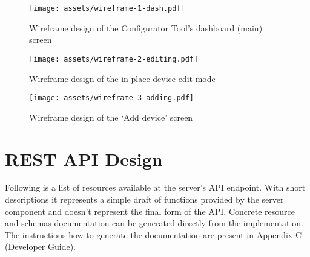 \begin{figure}[h]{}
\centering\texttt{[image: assets/wireframe-1-dash.pdf]}
\caption{Wireframe design of the Configurator Tool's dashboard (main) screen}
\end{figure}

\begin{figure}[h]{}
\centering\texttt{[image: assets/wireframe-2-editing.pdf]}
\caption{Wireframe design of the in-place device edit mode}
\end{figure}

\begin{figure}[h]{}
\centering\texttt{[image: assets/wireframe-3-adding.pdf]}
\caption{Wireframe design of the `Add device' screen}
\end{figure}

\hypertarget{x-rest-api-design}{\section{REST API Design}}
Following is a list of resources available at the server’s API endpoint.
With short descriptions it represents a simple draft of functions provided 
by the server component and doesn't represent the final form of the API.
Concrete resource and schemas documentation can be generated directly
from the implementation. The instructions how to generate the documentation
are present in Appendix C (Developer Guide).

